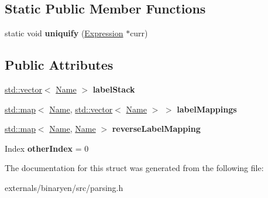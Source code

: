 \subsection*{Static Public Member Functions}
\begin{DoxyCompactItemize}
\item 
\mbox{\label{structwasm_1_1_unique_name_mapper_ad87862462f3fef6da670d2776b82ed6c}} 
static void {\bfseries uniquify} (\mbox{\hyperlink{classwasm_1_1_expression}{Expression}} $\ast$curr)
\end{DoxyCompactItemize}
\subsection*{Public Attributes}
\begin{DoxyCompactItemize}
\item 
\mbox{\label{structwasm_1_1_unique_name_mapper_a1196d38a1750f83751ed5e6c773a2922}} 
\mbox{\hyperlink{classstd_1_1vector}{std\+::vector}}$<$ \mbox{\hyperlink{structwasm_1_1_name}{Name}} $>$ {\bfseries label\+Stack}
\item 
\mbox{\label{structwasm_1_1_unique_name_mapper_a665491b91c185b9bcc2de4883d643f15}} 
\mbox{\hyperlink{classstd_1_1map}{std\+::map}}$<$ \mbox{\hyperlink{structwasm_1_1_name}{Name}}, \mbox{\hyperlink{classstd_1_1vector}{std\+::vector}}$<$ \mbox{\hyperlink{structwasm_1_1_name}{Name}} $>$ $>$ {\bfseries label\+Mappings}
\item 
\mbox{\label{structwasm_1_1_unique_name_mapper_a60560a6f37e19d743df55cf7101f35e4}} 
\mbox{\hyperlink{classstd_1_1map}{std\+::map}}$<$ \mbox{\hyperlink{structwasm_1_1_name}{Name}}, \mbox{\hyperlink{structwasm_1_1_name}{Name}} $>$ {\bfseries reverse\+Label\+Mapping}
\item 
\mbox{\label{structwasm_1_1_unique_name_mapper_adfec5e06cf33f19c8e967cb5e3e44846}} 
Index {\bfseries other\+Index} = 0
\end{DoxyCompactItemize}


The documentation for this struct was generated from the following file\+:\begin{DoxyCompactItemize}
\item 
externals/binaryen/src/parsing.\+h\end{DoxyCompactItemize}
